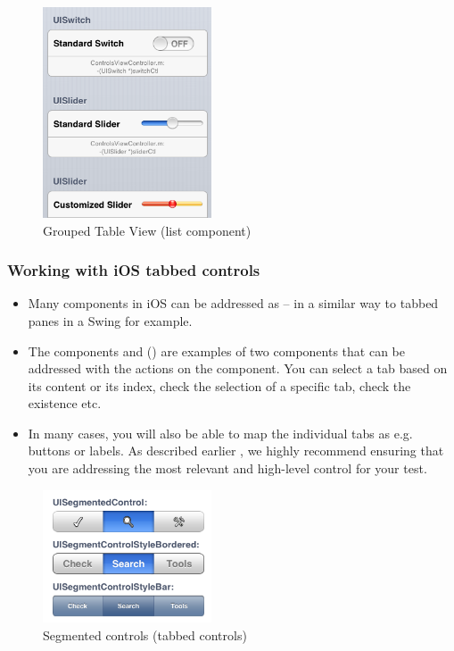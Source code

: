 \begin{figure}[h]
\begin{center}
\includegraphics[width=5cm]{Toolkit/iOS/PS/TableViewGrouped}
\caption{Grouped Table View (list component)}
\label{TableViewGrouped}
\end{center}
\end{figure}



\subsubsection{Working with iOS tabbed controls}
\begin{itemize}
\item Many components in iOS \gdauts{} can be addressed as  -- in a similar way to tabbed panes in a Swing \gdaut{} for example. 
\item The components  and  () are examples of two components that can be addressed with the actions on the  component. You can select a tab based on its content or its index, check the selection of a specific tab, check the existence etc.
\item In many cases, you will also be able to map the individual tabs as e.g. buttons or labels. As described earlier , we highly recommend ensuring that you are addressing the most relevant and high-level control for your test. 
\end{itemize}

\begin{figure}[h]
\begin{center}
\includegraphics[width=5cm]{Toolkit/iOS/PS/SegmentedControls}
\caption{Segmented controls (tabbed controls)}
\label{SegmentedControls}
\end{center}
\end{figure}


